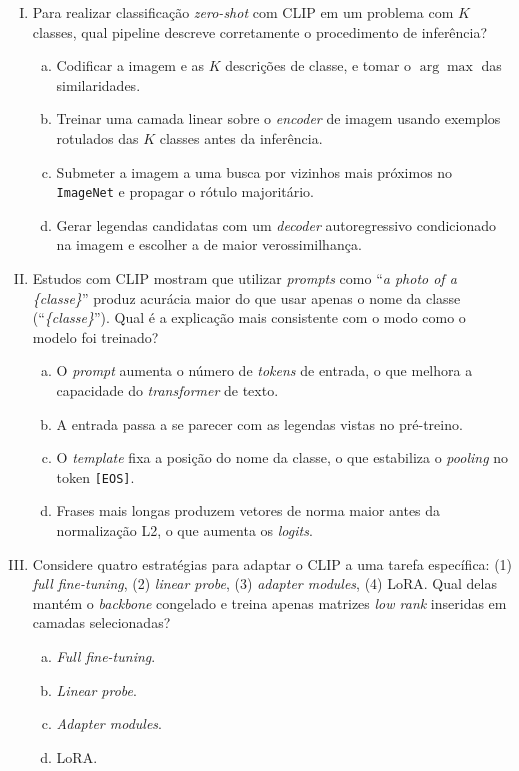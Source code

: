 \documentclass{dlproblemset}
\begin{document}
\begin{enumerate}[I)]
    \item Para realizar classificação \textit{zero-shot} com CLIP em um problema com $K$ classes, qual pipeline descreve corretamente o procedimento de inferência?
    \begin{enumerate}[(a)]
        \item Codificar a imagem e as $K$ descrições de classe, e tomar o $\arg\max$ das similaridades.
        \item Treinar uma camada linear sobre o \textit{encoder} de imagem usando exemplos rotulados das $K$ classes antes da inferência.
        \item Submeter a imagem a uma busca por vizinhos mais próximos no \texttt{ImageNet} e propagar o rótulo majoritário.
        \item Gerar legendas candidatas com um \textit{decoder} autoregressivo condicionado na imagem e escolher a de maior verossimilhança.
    \end{enumerate}

    \item Estudos com CLIP mostram que utilizar \textit{prompts} como ``\textit{a photo of a \{classe\}}'' produz acurácia maior do que usar apenas o nome da classe (``\textit{\{classe\}}''). Qual é a explicação mais consistente com o modo como o modelo foi treinado?
    \begin{enumerate}[(a)]
        \item O \textit{prompt} aumenta o número de \textit{tokens} de entrada, o que melhora a capacidade do \textit{transformer} de texto.
        \item A entrada passa a se parecer com as legendas vistas no pré-treino.
        \item O \textit{template} fixa a posição do nome da classe, o que estabiliza o \textit{pooling} no token \texttt{[EOS]}.
        \item Frases mais longas produzem vetores de norma maior antes da normalização L2, o que aumenta os \textit{logits}.
    \end{enumerate}

    \item Considere quatro estratégias para adaptar o CLIP a uma tarefa específica: (1) \textit{full fine-tuning}, (2) \textit{linear probe}, (3) \textit{adapter modules}, (4) LoRA. Qual delas mantém o \textit{backbone} congelado e treina apenas matrizes \textit{low rank} inseridas em camadas selecionadas?
    \begin{enumerate}[(a)]
        \item \textit{Full fine-tuning}.
        \item \textit{Linear probe}.
        \item \textit{Adapter modules}.
        \item LoRA.
    \end{enumerate}


\end{enumerate}
\end{document}
